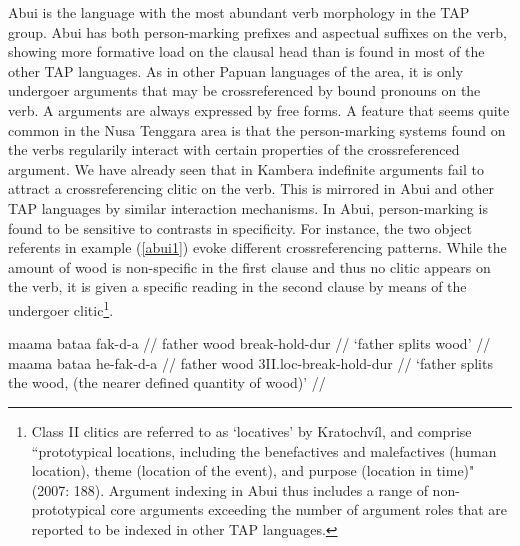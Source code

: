 Abui is the language with the most abundant verb morphology in the TAP group. Abui has both person-marking prefixes and aspectual suffixes on the verb, showing more formative load on the clausal head than is found in most of the other TAP languages. As in other Papuan languages of the area, it is only undergoer arguments that may be crossreferenced by bound pronouns on the verb. A arguments are always expressed by free forms. A feature that seems quite common in the Nusa Tenggara area is that the person-marking systems found on the verbs regularily interact with certain properties of the crossreferenced argument. We have already seen that in Kambera indefinite arguments fail to attract a crossreferencing clitic on the verb. This is mirrored in Abui and other TAP languages by similar interaction mechanisms. In Abui, person-marking is found to be sensitive to contrasts in specificity. For instance, the two object referents in example (\ref{abui1}) evoke different crossreferencing patterns. While the amount of wood is non-specific in the first clause and thus no clitic appears on the verb, it is given a specific reading in the second clause by means of the undergoer clitic\footnote{Class II clitics are referred to as `locatives' by Kratochvíl, and comprise ``prototypical locations, including the
benefactives and malefactives (human location), theme (location of the event), and
purpose (location in time)" (2007: 188). Argument indexing in Abui thus includes a range of non-prototypical core arguments exceeding the number of argument roles that are reported to be indexed in other TAP languages.}.

\pex \label{abui1}
\a
\begingl
\gla maama bataa fak-d-a // 
\glb father wood break-hold-\acs{dur} //
\glft `father splits wood’ // 
\endgl
\a
\begingl
\gla maama bataa he-fak-d-a // 
\glb father wood \acs{3}II.\acs{loc}-break-hold-\acs{dur} //
\glft `father splits the wood, (the nearer defined quantity of wood)’ // 
\endgl
\xe

